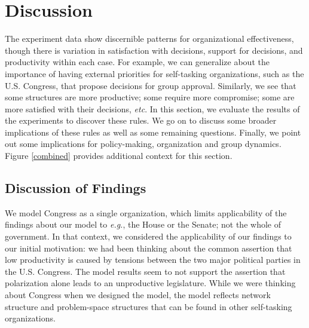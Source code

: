 \documentclass[pdftex,12pt]{llncs}
\begin{document}
\section{Discussion}
%

	
The experiment data show discernible patterns for organizational effectiveness, though there is variation in satisfaction with decisions, support for decisions, and productivity within each case.
For example, we can generalize about the importance of having external priorities for self-tasking organizations, such as the U.S. Congress, that propose decisions for group approval. 
Similarly, we see that some structures are more productive; some require more compromise; some are more satisfied with their decisions, \textit{etc}. 
In this section, we evaluate the results of the experiments to discover these rules. 
We go on to discuss some broader implications of these rules as well as some remaining questions.
Finally, we point out some implications for policy-making, organization and group dynamics. 
Figure \ref{combined} provides additional context for this section.


\subsection{Discussion of Findings}
We model Congress as a single organization, which limits applicability of the findings about our model to \textit{e.g.}, the House or the Senate; not the whole of government.
In that context, we considered the applicability of our findings to our initial motivation: we had been thinking about the common assertion that low productivity is caused by tensions between the two major political parties in the U.S. Congress.  
The model results seem to not support the assertion that polarization alone leads to an unproductive legislature. 
While we were thinking about Congress when we designed the model, the model reflects network structure and problem-space structures that can be found in other self-tasking organizations.
\end{document}
